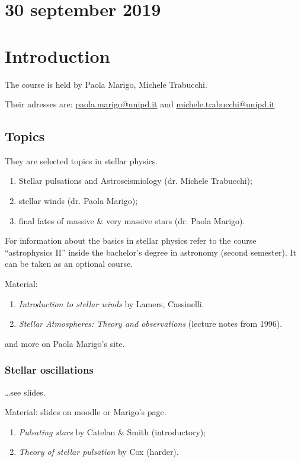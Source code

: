 \documentclass[main.tex]{subfiles}
\begin{document}
\section*{30 september 2019}
\section{Introduction}

The course is held by Paola Marigo, Michele Trabucchi.

Their adresses are:
\url{paola.marigo@unipd.it} and
\url{michele.trabucchi@unipd.it}

\subsection{Topics}

They are selected topics in stellar physics.
%
\begin{enumerate}
    \item Stellar pulsations and Astroseismiology (dr. Michele Trabucchi);
    \item stellar winds (dr. Paola Marigo);
    \item final fates of massive \& very massive stars (dr. Paola Marigo).
\end{enumerate}

For information about the basics in stellar physics refer to the course ``astrophysics II'' inside the bachelor's degree in astronomy (second semester). It can be taken as an optional course.

Material:

\begin{enumerate}
    \item \emph{Introduction to stellar winds} by Lamers, Cassinelli.
    \item \emph{Stellar Atmospheres: Theory and observations} (lecture notes from 1996).
\end{enumerate}
%
and more on Paola Marigo's site.

\subsubsection{Stellar oscillations}

\dots see slides.

Material: slides on moodle or Marigo's page.

\begin{enumerate}
    \item \emph{Pulsating stars} by Catelan \& Smith (introductory);
    \item \emph{Theory of stellar pulsation} by Cox (harder).
\end{enumerate}
\end{document}
